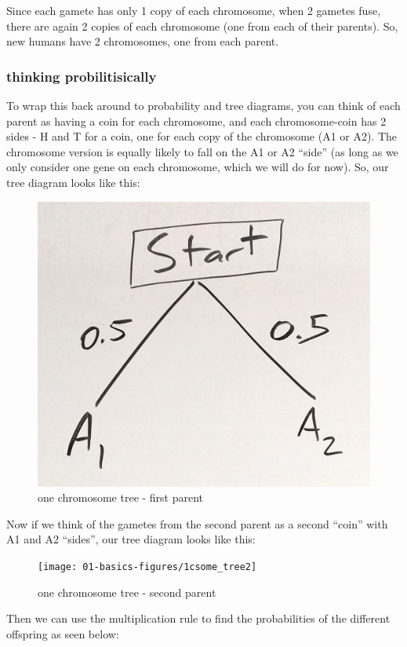 \documentclass[]{book}
\theoremstyle{definition}
\theoremstyle{definition}
\theoremstyle{definition}
\theoremstyle{remark}
\begin{document}
Since each gamete has only 1 copy of each chromosome, when 2 gametes
fuse, there are again 2 copies of each chromosome (one from each of
their parents). So, new humans have 2 chromosomes, one from each parent.

\subsubsection{thinking
probilitisically}\label{thinking-probilitisically}

To wrap this back around to probability and tree diagrams, you can think
of each parent as having a coin for each chromosome, and each
chromosome-coin has 2 sides - H and T for a coin, one for each copy of
the chromosome (A1 or A2). The chromosome version is equally likely to
fall on the A1 or A2 ``side'' (as long as we only consider one gene on
each chromosome, which we will do for now). So, our tree diagram looks
like this:

\begin{figure}

{\centering \includegraphics[width=0.5\linewidth]{01-basics-figures/1csome_tree} 

}

\caption{one chromosome tree - first parent}\label{fig:gen-fig-154}
\end{figure}

Now if we think of the gametes from the second parent as a second
``coin'' with A1 and A2 ``sides'', our tree diagram looks like this:

\begin{figure}

{\centering \texttt{[image: 01-basics-figures/1csome\_tree2]} 

}

\caption{one chromosome tree - second parent}\label{fig:gen-fig-155}
\end{figure}

Then we can use the multiplication rule to find the probabilities of the
different offspring as seen below:
\end{document}
